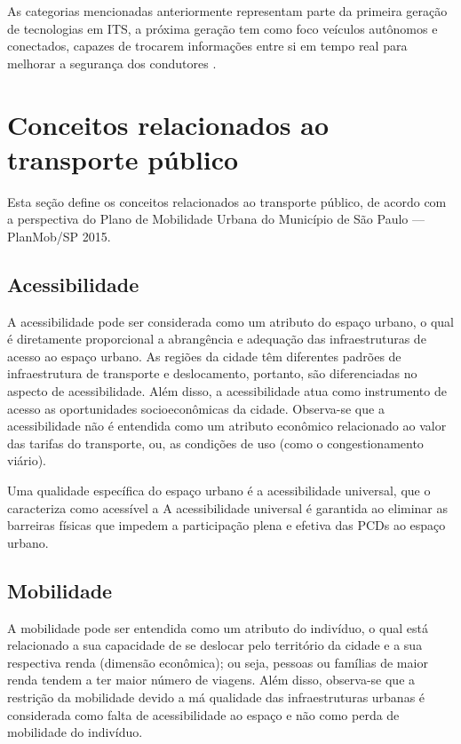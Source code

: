 \documentclass[
	12pt,				%
	oneside,			%
	a4paper,			%
	english,			%
	brazil				%
	]{abntex2ppgsi}
\begin{document}
As categorias mencionadas anteriormente representam parte da primeira geração de tecnologias em ITS, a próxima geração tem como foco veículos autônomos e conectados, capazes de trocarem informações entre si em tempo real para melhorar a segurança dos condutores \cite{menouar2017uav}. 

\section{Conceitos relacionados ao transporte público}
\label{mobility}

Esta seção define os conceitos relacionados ao transporte público, de acordo com a perspectiva do Plano de Mobilidade Urbana do Município de São Paulo --- PlanMob/SP 2015.

\subsection{Acessibilidade}
A acessibilidade pode ser considerada como um atributo do espaço urbano, o qual é diretamente proporcional a abrangência e adequação das infraestruturas de acesso ao espaço urbano. As regiões da cidade têm diferentes padrões de infraestrutura de transporte e deslocamento, portanto, são diferenciadas no aspecto de acessibilidade. Além disso, a acessibilidade atua como instrumento de acesso as oportunidades socioeconômicas da cidade. Observa-se que a acessibilidade não é entendida como um atributo econômico relacionado ao valor das tarifas do transporte, ou, as condições de uso (como o congestionamento viário).

Uma qualidade específica do espaço urbano é a acessibilidade universal, que o caracteriza como acessível a  A acessibilidade universal é garantida ao eliminar as barreiras físicas que impedem a participação plena e efetiva das PCDs ao espaço urbano.

\subsection{Mobilidade}

A mobilidade pode ser entendida como um atributo do indivíduo, o qual está relacionado a sua capacidade de se deslocar pelo território da cidade e a sua respectiva renda (dimensão econômica); ou seja, pessoas ou famílias de maior renda tendem a ter maior número de viagens. Além disso, observa-se que a restrição da mobilidade devido a má qualidade das infraestruturas urbanas é considerada como falta de acessibilidade ao espaço e não como perda de mobilidade do indivíduo.
\end{document}

